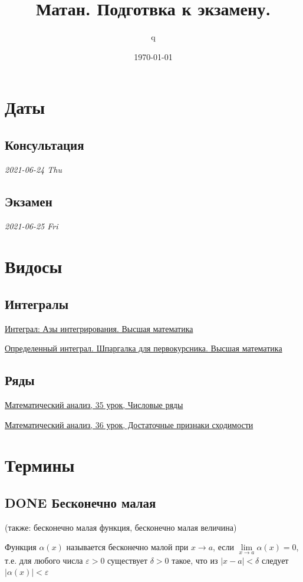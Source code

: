 \documentclass[11pt]{article}
\author{q}
\date{\today}
\title{Матан. Подготвка к экзамену.}
\begin{document}
\maketitle
\tableofcontents

\section{Даты}
\label{sec:orgbc0e9ab}
\subsection{Консультация}
\label{sec:org9d30051}
\emph{2021-06-24 Thu}
\subsection{Экзамен}
\label{sec:orge2d62c4}
\emph{2021-06-25 Fri}

\section{Видосы}
\label{sec:orga8e0dcd}
\subsection{Интегралы}
\label{sec:orgf6bf37d}
\href{https://www.youtube.com/watch?v=nCx6FTChgow}{Интеграл: Азы интегрирования. Высшая математика}

\href{https://www.youtube.com/watch?v=wEmtlqJy2MM}{Определенный интеграл. Шпаргалка для первокурсника. Высшая математика}
\subsection{Ряды}
\label{sec:org9149ba9}
\href{https://www.youtube.com/watch?v=XcofHzGx9Ug}{Математический анализ, 35 урок, Числовые ряды}

\href{https://www.youtube.com/watch?v=uq78fpEas5I}{Математический анализ, 36 урок, Достаточные признаки сходимости}
\section{Термины}
\label{sec:org33b343d}
\subsection{{\bfseries\sffamily DONE} Бесконечно малая}
\label{sec:org690a301}
(также: бесконечно малая функция, бесконечно малая величина)

Функция \(\alpha(x)\) называется бесконечно малой при \(x\to a\), если \(\lim\limits_{x\to a}\alpha(x)=0\), т.е. для любого числа \(\varepsilon >0\) существует \(\delta>0\) такое, что из \(|x−a|<\delta\) следует \(|\alpha(x)|<\varepsilon\)
\end{document}
